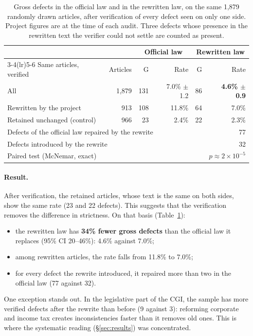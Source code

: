 \documentclass[11pt,a4paper]{article}
\begin{document}
\begin{table}[ht]
\centering
\small
\begin{tabular}{lrrrrr}
\toprule
& & \multicolumn{2}{c}{Official law} & \multicolumn{2}{c}{Rewritten law}\\
\cmidrule(lr){3-4}\cmidrule(lr){5-6}
Same articles, verified & Articles & G & Rate & G & Rate\\
\midrule
All & 1{,}879 & 131 & 7.0\% $\pm$ 1.2 & 86 & \textbf{4.6\% $\pm$ 0.9}\\
Rewritten by the project & 913 & 108 & 11.8\% & 64 & 7.0\%\\
Retained unchanged (control) & 966 & 23 & 2.4\% & 22 & 2.3\%\\
\midrule
\multicolumn{4}{l}{Defects of the official law repaired by the rewrite} & \multicolumn{2}{r}{77}\\
\multicolumn{4}{l}{Defects introduced by the rewrite} & \multicolumn{2}{r}{32}\\
\multicolumn{4}{l}{Paired test (McNemar, exact)} & \multicolumn{2}{r}{$p \approx 2\times10^{-5}$}\\
\bottomrule
\end{tabular}
\caption{Gross defects in the official law and in the rewritten law, on the same 1{,}879 randomly drawn articles, after verification of every defect seen on only one side. Project figures are at the time of each audit. Three defects whose presence in the rewritten text the verifier could not settle are counted as present.}
\label{tab:baseline}
\end{table}

\paragraph{Result.}
After verification, the retained articles, whose text is the same on both sides, show the same rate (23 and 22 defects). This suggests that the verification removes the difference in strictness. On that basis (Table~\ref{tab:baseline}):
\begin{itemize}
  \item the rewritten law has \textbf{34\% fewer gross defects} than the official law it replaces (95\% CI 20--46\%): 4.6\% against 7.0\%;
  \item among rewritten articles, the rate falls from 11.8\% to 7.0\%;
  \item for every defect the rewrite introduced, it repaired more than two in the official law (77 against 32).
\end{itemize}
One exception stands out. In the legislative part of the CGI, the sample has more verified defects after the rewrite than before (9 against 3): reforming corporate and income tax creates inconsistencies faster than it removes old ones. This is where the systematic reading (\S\ref{sec:results}) was concentrated.
\end{document}
